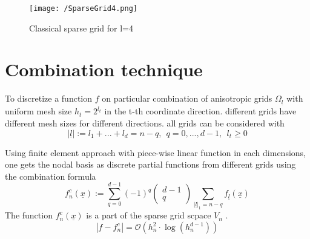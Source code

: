 	\begin{figure}
			\centering
			\texttt{[image: /SparseGrid4.png]}
			\caption{Classical sparse grid for l=4}
			\label{fig:Sparsegrid4}
		\end{figure}

\section{Combination technique}
To discretize a function $f$ on particular combination of anisotropic grids $\Omega_{\underline{l}}$ with uniform mesh size $h_{t} = 2^{l_{t}}$ in the t-th coordinate direction.  different grids have different mesh sizes for different directions. 
all grids can be considered with
\begin{equation}
	|\underline{l}| := l_1 + ... + l_d = n-q, \ \ q = 0,...,d - 1, \ \ l_t \ge 0
\end{equation}

Using finite element approach with piece-wise linear function in each dimensions, one gets the nodal basis as discrete partial functions from different grids using the combination formula
\begin{equation}
	f_n^c(\underline{x}) := \sum_{q=0}^{d-1}(-1)^q \left( \begin{array}{c}
	d-1 \\
	q  \end{array} \right) \sum_{|\underline{l}|_1=n-q} f_{\underline{l}}(\underline{x})
\end{equation}
The function $f_n^c(\underline{x})$ is a part of the sparse grid scpace $V_{n}$ .
\begin{equation}
	|f-f_n^c| = \mathcal{O}\left(h_n^2 \cdot \log(h_{n}^{d-1}) \right)
\end{equation}

